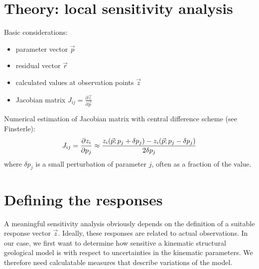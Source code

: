 \documentclass[a4paper,10pt,english]{sphinxmanual}
\begin{document}
\section{Theory: local sensitivity analysis}
\label{notebooks/8-Sensitivity-Analysis:theory-local-sensitivity-analysis}
Basic considerations:
\begin{itemize}
\item {} 
parameter vector \(\vec{p}\)

\item {} 
residual vector \(\vec{r}\)

\item {} 
calculated values at observation points \(\vec{z}\)

\item {} 
Jacobian matrix
\(J_{ij} = \frac{\partial \vec{z}}{\partial \vec{p}}\)

\end{itemize}

Numerical estimation of Jacobian matrix with central difference scheme
(see Finsterle):
\begin{gather}
\begin{split}J_{ij} = \frac{\partial z_i}{\partial p_j} \approx \frac{z_i(\vec{p}; p_j + \delta p_j) - z_i(\vec{p};p_j - \delta p_j)}{2 \delta p_j}\end{split}\notag
\end{gather}
where \(\delta p_j\) is a small perturbation of parameter \(j\),
often as a fraction of the value.


\section{Defining the responses}
\label{notebooks/8-Sensitivity-Analysis:defining-the-responses}
A meaningful sensitivity analysis obviously depends on the definition of
a suitable response vector \(\vec{z}\). Ideally, these responses are
related to actual observations. In our case, we first want to determine
how sensitive a kinematic structural geological model is with respect to
uncertainties in the kinematic parameters. We therefore need
calculatable measures that describe variations of the model.
\end{document}
